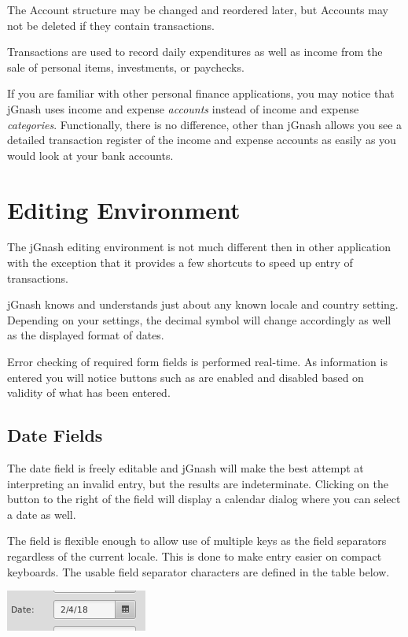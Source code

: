 \documentclass[letterpaper,12pt]{book}
\begin{document}
    The Account structure may be changed and reordered later, but Accounts may not be deleted if they contain transactions.

    Transactions are used to record daily expenditures as well as income from the sale of personal items, investments, or
    paychecks.

    If you are familiar with other personal finance applications, you may notice that jGnash uses income and expense
    \textit{accounts} instead of income and expense \textit{categories}.
    Functionally, there is no difference, other than jGnash allows you see a detailed transaction register of the
    income and expense accounts as easily as you would look at your bank accounts.

    \section{Editing Environment}\label{sec:editing-environment}
    The jGnash editing environment is not much different then in other application with the exception that it provides a
    few shortcuts to speed up entry of transactions.

    jGnash knows and understands just about any known locale and country setting.
    Depending on your settings, the decimal symbol will change accordingly as well as the displayed format of dates.

    Error checking of required form fields is performed real-time.
    As information is entered you will notice buttons such as  are enabled and disabled based on validity
    of what has been entered.

    \subsection{Date Fields}\label{subsec:dateFields}
    The date field is freely editable and jGnash will make the best attempt at interpreting an invalid entry, but the results
    are indeterminate.
    Clicking on the button to the right of the field will display a calendar dialog where you can select a date as well.

    The field is flexible enough to allow use of multiple keys as the field separators regardless of the current locale.
    This is done to make entry easier on compact keyboards.
    The usable field separator characters are defined in the table below.

    \includegraphics[scale=.8]{images/date-entry}
\end{document}
